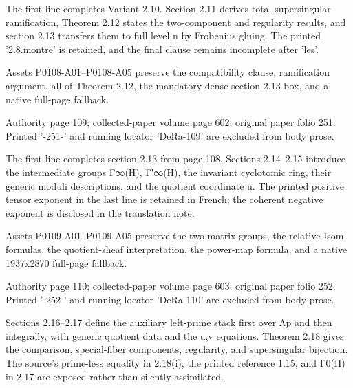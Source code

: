 \documentclass[11pt,a4paper]{article}
\begin{document}
The first line completes Variant 2.10. Section 2.11 derives total supersingular ramification, Theorem 2.12 states the two-component and regularity results, and section 2.13 transfers them to full level n by Frobenius gluing. The printed '2.8.montre' is retained, and the final clause remains incomplete after 'les'.

Assets P0108-A01--P0108-A05 preserve the compatibility clause, ramification argument, all of Theorem 2.12, the mandatory dense section 2.13 box, and a native full-page fallback.


\par\medskip
\hypertarget{D018-P0109}{}
\par\smallskip
Authority page 109; collected-paper volume page 602; original paper folio 251. Printed '-251-' and running locator 'DeRa-109' are excluded from body prose.

The first line completes section 2.13 from page 108. Sections 2.14--2.15 introduce the intermediate groups Γ\textunderscore{}∞(H), Γ′\textunderscore{}∞(H), the invariant cyclotomic ring, their generic moduli descriptions, and the quotient coordinate u. The printed positive tensor exponent in the last line is retained in French; the coherent negative exponent is disclosed in the translation note.

Assets P0109-A01--P0109-A05 preserve the two matrix groups, the relative-Isom formulas, the quotient-sheaf interpretation, the power-map formula, and a native 1937x2870 full-page fallback.


\par\medskip
\hypertarget{D018-P0110}{}
\par\smallskip
Authority page 110; collected-paper volume page 603; original paper folio 252. Printed '-252-' and running locator 'DeRa-110' are excluded from body prose.

Sections 2.16--2.17 define the auxiliary left-prime stack first over Λ\textunderscore{}p and then integrally, with generic quotient data and the u,v equations. Theorem 2.18 gives the comparison, special-fiber components, regularity, and supersingular bijection. The source's prime-less equality in 2.18(i), the printed reference 1.15, and Γ\textunderscore{}0(H) in 2.17 are exposed rather than silently assimilated.
\end{document}
